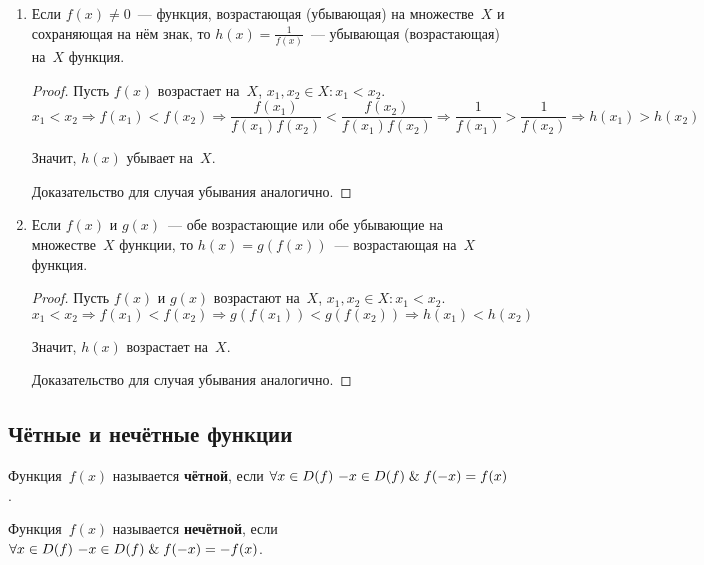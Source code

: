 \begin{enumerate}
\begin{proof}
	Значит, $h(x)$ убывает на~$X$.
	
	Доказательства для остальных трёх случаев аналогичны.
	\end{proof}
	
	\item Если $f(x) \neq 0$~--- функция, возрастающая (убывающая) на множестве~$X$ и сохраняющая на нём знак, то $h(x) = \frac1{f(x)}$~--- убывающая (возрастающая) на~$X$ функция.
	\begin{proof}
	Пусть $f(x)$ возрастает на~$X$, $x_1, x_2 \in X \colon x_1 < x_2$.
	\begin{equation*}
	x_1 < x_2 \Rightarrow
	f(x_1) < f(x_2) \Rightarrow
	\frac{f(x_1)}{f(x_1)f(x_2)} < \frac{f(x_2)}{f(x_1)f(x_2)} \Rightarrow
	\frac1{f(x_1)} > \frac1{f(x_2)} \Rightarrow
	h(x_1) > h(x_2)
	\end{equation*}
	
	Значит, $h(x)$ убывает на~$X$.
		
	Доказательство для случая убывания аналогично.
	\end{proof}
	
	\item Если $f(x)$ и $g(x)$~--- обе возрастающие или обе убывающие на множестве~$X$ функции, то $h(x) = g(f(x))$~--- возрастающая на~$X$ функция.
	\begin{proof}
	Пусть $f(x)$ и $g(x)$ возрастают на~$X$, $x_1, x_2 \in X \colon x_1 < x_2$.
	\begin{equation*}
	x_1 < x_2 \Rightarrow
	f(x_1) < f(x_2) \Rightarrow
	g(f(x_1)) < g(f(x_2)) \Rightarrow
	h(x_1) < h(x_2)
	\end{equation*}
	
	Значит, $h(x)$ возрастает на~$X$.
	
	Доказательство для случая убывания аналогично.
	\end{proof}
\end{enumerate}

\subsection{Чётные и нечётные функции}
 Функция~$f(x)$ называется \textbf{чётной}, если $\forall x \in D(f) \ {-x} \in D(f) \mathrel{\&} f(-x) = f(x)$.

 Функция~$f(x)$ называется \textbf{нечётной}, если $\forall x \in D(f) \ {-x} \in D(f) \mathrel{\&} f(-x) = -f(x)$.

